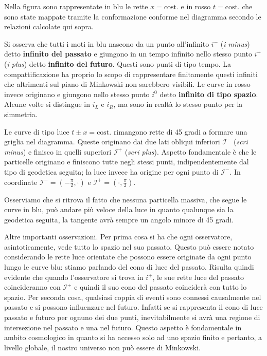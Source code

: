 Nella figura sono rappresentate in blu le rette $x = \textrm{cost.}$ e in rosso $t = \textrm{cost.}$ che sono state mappate tramite la conformazione conforme nel diagramma secondo le relazioni calcolate qui sopra.

Si osserva che tutti i moti in blu nascono da un punto all'infinito $i^-$ (\emph{i minus}) detto \textbf{infinito del passato} e giungono in un tempo infinito nello stesso punto $i^+$ (\emph{i plus}) detto \textbf{infinito del futuro}. Questi sono punti di tipo tempo. La compattificazione ha proprio lo scopo di rappresentare finitamente questi infiniti che altrimenti sul piano di Minkowski non sarebbero visibili. Le curve in rosso invece originano e giungono nello stesso punto $i^0$ detto \textbf{infinito di tipo spazio}. Alcune volte si distingue in $i_L$ e $i_R$, ma sono in realtà lo stesso punto per la simmetria.

Le curve di tipo luce $t \pm x = \textrm{cost.}$ rimangono rette di 45 gradi a formare una griglia nel diagramma. Queste originano dai due lati obliqui inferiori $\mathcal{I}^-$ (\emph{scri minus}) e finisco in quelli superiori $\mathcal{I}^+$ (\emph{scri plus}). Aspetto fondamentale è che le particelle originano e finiscono tutte negli stessi punti, indipendentemente dal tipo di geodetica seguita; la luce invece ha origine per ogni punto di $\mathcal{I}^-$. In coordinate $\mathcal{I}^- = ( -\frac{\pi}{2}, \cdot)$ e $\mathcal{I}^+ =( \cdot, \frac{\pi}{2})$.

Osserviamo che si ritrova il fatto che nessuna particella massiva, che segue le curve in blu, può andare più veloce della luce in quanto qualunque sia la geodetica seguita, la tangente avrà sempre un angolo minore di 45 gradi.

Altre importanti osservazioni. Per prima cosa si ha che ogni osservatore, asintoticamente, vede tutto lo spazio nel suo passato. Questo può essere notato considerando le rette luce orientate  che possono essere originate da ogni punto lungo le curve blu: stiamo parlando del cono di luce del passato. Risulta quindi evidente che quando l'osservatore si trova in $i^+$, le sue rette luce del passato coincideranno con $\mathcal{I}^+$ e quindi il suo cono del passato coinciderà con tutto lo spazio.
Per seconda cosa, qualsiasi coppia di eventi sono connessi causalmente nel passato e si possono influenzare nel futuro. Infatti se si rappresenta il cono di luce passato e futuro per ognuno dei due punti, inevitabilmente si avrà una regione di intersezione nel passato e una nel futuro. Questo aspetto è fondamentale in ambito cosmologico in quanto si ha accesso solo ad uno spazio finito e pertanto, a livello globale, il nostro universo non può essere di Minkowski.

